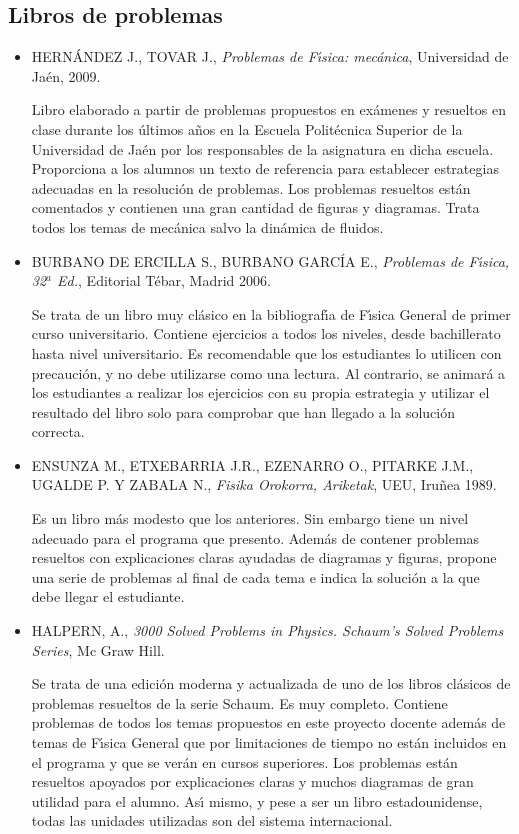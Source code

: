 \subsection{Libros de problemas}
\begin{itemize}


\item HERN\'{A}NDEZ J., TOVAR J.,
 {\it Problemas de F\'{\i}sica: mec\'{a}nica}, 
Universidad de Ja\'{e}n, 2009.

Libro elaborado  a partir de problemas propuestos
en ex\'{a}menes y resueltos en clase durante los \'{u}ltimos a\~{n}os en la 
Escuela Polit\'{e}cnica Superior de la Universidad de Ja\'{e}n por los responsables de la 
asignatura en dicha escuela. Proporciona a los
alumnos un texto de referencia para establecer estrategias adecuadas en la resoluci\'{o}n de 
problemas. Los problemas resueltos est\'{a}n comentados y contienen una gran cantidad 
de figuras y diagramas. Trata todos los temas de mec\'{a}nica salvo la din\'{a}mica de 
fluidos.


\item BURBANO DE ERCILLA S., BURBANO GARC\'{I}A E.,
 {\it Problemas de F\'{\i}sica, 32$^a$ Ed.},
 Editorial T\'ebar, Madrid 2006.

Se trata de un libro muy cl\'{a}sico en la bibliograf\'{\i}a de 
F\'{\i}sica General de primer curso universitario. Contiene ejercicios a todos 
los niveles, desde bachillerato hasta nivel universitario. Es recomendable que los 
estudiantes lo utilicen con precauci\'{o}n, y no
debe utilizarse como una lectura. Al contrario, se animar\'{a} a los estudiantes
a realizar los 
ejercicios con su propia estrategia y utilizar el resultado del libro solo para 
comprobar que han llegado a la soluci\'{o}n correcta.

\item ENSUNZA M., ETXEBARRIA J.R., EZENARRO O., PITARKE J.M., UGALDE P. Y ZABALA N., 
{\it Fisika Orokorra, Ariketak},
 UEU, Iru\~{n}ea 1989.

Es un libro m\'{a}s modesto que los anteriores. Sin embargo tiene un nivel adecuado
para el programa que presento. Adem\'{a}s de contener problemas resueltos
con explicaciones claras ayudadas de diagramas y figuras, propone una serie de 
problemas al final de cada tema e indica la soluci\'{o}n a la que debe llegar el estudiante.

\item HALPERN, A.,
{\it 3000 Solved Problems in Physics. Schaum's Solved Problems Series},
Mc Graw Hill.

Se trata de una edici\'{o}n moderna y actualizada de uno de los libros cl\'{a}sicos de problemas
resueltos de la serie Schaum. Es muy completo. Contiene problemas de todos los temas propuestos en
este proyecto docente adem\'{a}s de temas de F\'{\i}sica General que por limitaciones de tiempo no est\'{a}n 
incluidos en el programa y que se ver\'{a}n en cursos superiores. 
Los problemas est\'{a}n resueltos apoyados por explicaciones claras y muchos diagramas de gran utilidad para 
el alumno. As\'{\i} mismo, y pese a ser un libro estadounidense, todas las unidades utilizadas son del sistema 
internacional.


\end{itemize}


